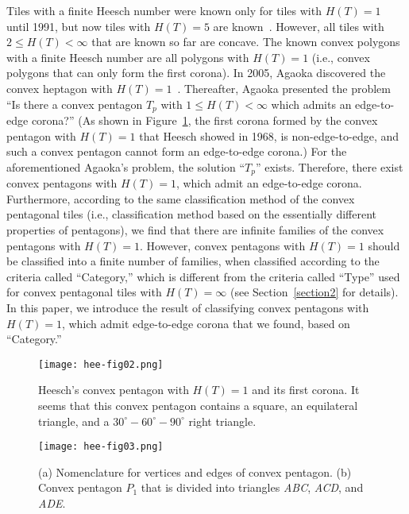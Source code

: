 \documentclass[11pt, a4paper]{article}
\begin{document}
Tiles with a finite Heesch number were known only for tiles with $H(T) = 1$ 
until 1991, but now tiles with $H(T) = 5$ are known~\cite{Mann_2004, Wiki_HeeP}. 
However, all tiles with $2 \le H(T) < \infty $ that are known so far are 
concave. The known convex polygons with a finite Heesch number are all 
polygons with $H(T) = 1$ (i.e., convex polygons that can only form the 
first corona). In 2005, Agaoka discovered the convex heptagon with 
$H(T) = 1$~\cite{Agaoka_2005}. Thereafter, Agaoka presented the problem 
``Is there a convex pentagon $T_{p}$ with $1 \le H(T) < \infty$ 
which admits an edge-to-edge corona?'' (As shown in Figure~\ref{fig02}, the first 
corona formed by the convex pentagon with $H(T) = 1$ that Heesch showed in 
1968, is non-edge-to-edge, and such a convex pentagon cannot form an 
edge-to-edge corona.) For the aforementioned Agaoka's problem, the 
solution ``$T_{p}$'' exists. Therefore, there exist convex pentagons with 
$H(T) = 1$, which admit an edge-to-edge corona. Furthermore, according to 
the same classification method of the convex pentagonal tiles (i.e., 
classification method based on the essentially different properties of 
pentagons), we find that there are infinite families of the convex pentagons 
with $H(T) = 1$. However, convex pentagons with $H(T) = 1$ should be 
classified into a finite number of families, when classified according to 
the criteria called ``Category,'' which is different from the criteria 
called ``Type'' used for convex pentagonal tiles with $H(T) = \infty $ (see 
Section~\ref{section2} for details). In this paper, we introduce the result of 
classifying convex pentagons with $H(T) = 1$, which admit edge-to-edge 
corona that we found, based on ``Category.''




\renewcommand{\figurename}{{\small Figure.}}
\begin{figure}[htbp]
 \centering\texttt{[image: hee-fig02.png]} 
  \caption{{\small 
Heesch's convex pentagon with $H(T) = 1$ and its first corona. It 
seems that this convex pentagon contains a square, an equilateral 
triangle, and a $30^ \circ - 60^ \circ - 90^ \circ $ right triangle.
} 
\label{fig02}
}
\end{figure}




\renewcommand{\figurename}{{\small Figure.}}
\begin{figure}[htbp]
 \centering\texttt{[image: hee-fig03.png]} 
  \caption{{\small 
(a) Nomenclature for vertices and edges of convex pentagon. 
(b) Convex pentagon $P_{1}$ that is divided into triangles 
\textit{ABC}, \textit{ACD}, and \textit{ADE}.
} 
\label{fig03}
}
\end{figure}
\end{document}
